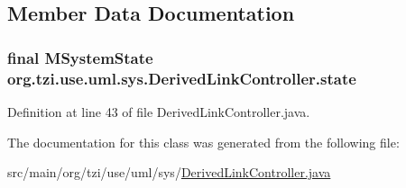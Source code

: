 \subsection{Member Data Documentation}
\hypertarget{classorg_1_1tzi_1_1use_1_1uml_1_1sys_1_1_derived_link_controller_a2870a3282e4dfeb13685cc71956abf78}{
\subsubsection[{state}]{\setlength{\rightskip}{0pt plus 5cm}final {\bf M\-System\-State} org.\-tzi.\-use.\-uml.\-sys.\-Derived\-Link\-Controller.\-state\hspace{0.3cm}{\ttfamily [protected]}}}\label{classorg_1_1tzi_1_1use_1_1uml_1_1sys_1_1_derived_link_controller_a2870a3282e4dfeb13685cc71956abf78}


Definition at line 43 of file Derived\-Link\-Controller.\-java.



The documentation for this class was generated from the following file\-:\begin{DoxyCompactItemize}
\item 
src/main/org/tzi/use/uml/sys/\hyperlink{_derived_link_controller_8java}{Derived\-Link\-Controller.\-java}\end{DoxyCompactItemize}
